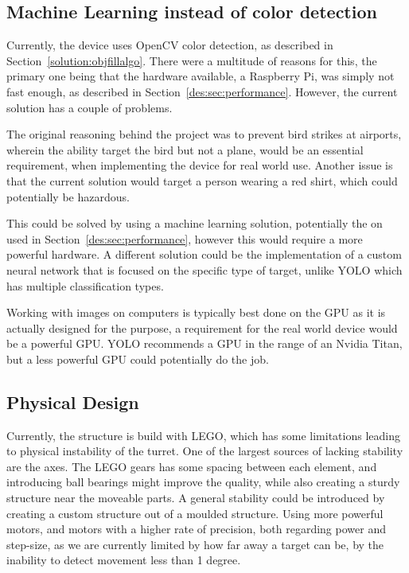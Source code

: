 \subsection{Machine Learning instead of color detection}

Currently, the device uses OpenCV color detection, as described in Section~\ref{solution:objfillalgo}.
There were a multitude of reasons for this, the primary one being that the hardware available, a Raspberry Pi, was simply not fast enough, as described in Section~\ref{des:sec:performance}.
However, the current solution has a couple of problems.

The original reasoning behind the project was to prevent bird strikes at airports, wherein the ability target the bird but not a plane, would be an essential requirement, when implementing the device for real world use.
Another issue is that the current solution would target a person wearing a red shirt, which could potentially be hazardous.

This could be solved by using a machine learning solution, potentially the on used in Section~\ref{des:sec:performance}, however this would require a more powerful hardware.
A different solution could be the implementation of a custom neural network that is focused on the specific type of target, unlike YOLO which has multiple classification types.

Working with images on computers is typically best done on the GPU as it is actually designed for the purpose, a requirement for the real world device would be a powerful GPU.
YOLO recommends a GPU in the range of an Nvidia Titan, but a less powerful GPU could potentially do the job.

\subsection{Physical Design}
Currently, the structure is build with LEGO, which has some limitations leading to physical instability of the turret.
One of the largest sources of lacking stability are the axes.
The LEGO gears has some spacing between each element, and introducing ball bearings might improve the quality, while also creating a sturdy structure near the moveable parts.
A general stability could be introduced by creating a custom structure out of a moulded structure.
Using more powerful motors, and motors with a higher rate of precision, both regarding power and step-size, as we are currently limited by how far away a target can be, by the inability to detect movement less than 1 degree.

